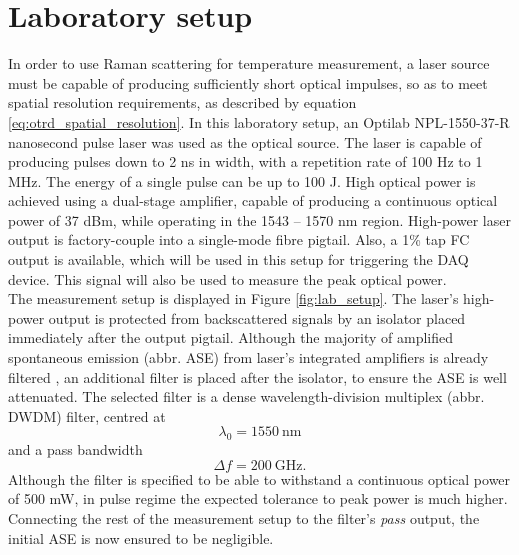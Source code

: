\documentclass{standalone}
\begin{document}
\chapter{Laboratory setup} \label{ch:setup}
\setcounter{page}\thestranica


In order to use Raman scattering for temperature measurement, a laser source must be capable of producing sufficiently short optical impulses, so as to meet spatial resolution requirements, as described by equation \ref{eq:otrd_spatial_resolution}. In this laboratory setup, an Optilab NPL-1550-37-R nanosecond pulse laser was used as the optical source. The laser is capable of producing pulses down to 2 ns in width, with a repetition rate of 100 Hz to 1 MHz. The energy of a single pulse can be up to 100 \textmu J. High optical power is achieved using a dual-stage amplifier, capable of producing a continuous optical power of 37 dBm, while operating in the 1543 -- 1570 nm region. High-power laser output is factory-couple into a single-mode fibre pigtail. Also, a 1\% tap FC output is available, which will be used in this setup for triggering the DAQ device. This signal will also be used to measure the peak optical power. \\

The measurement setup is displayed in Figure \ref{fig:lab_setup}.
The laser's high-power output is protected from backscattered signals by an isolator placed immediately after the output pigtail. Although the majority of amplified spontaneous emission (abbr. ASE) from laser's integrated amplifiers is already filtered \cite{datasheet:laser}, an additional filter is placed after the isolator, to ensure the ASE is well attenuated. The selected filter is a dense wavelength-division multiplex (abbr. DWDM) filter, centred at \cite{datasheet:dwdm_filter}
\begin{equation}
\label{eq:dwdm_filter_centre}
\lambda_0 = \SI{1550}{\nano \meter}
\end{equation} and a pass bandwidth 
\begin{equation}
\label{eq:dwdm_filter_bw}
\varDelta f = \SI{200}{\giga \hertz} \textrm{.}
\end{equation}
Although the filter is specified to be able to withstand a continuous optical power of 500 mW, in pulse regime the expected tolerance to peak power is much higher. Connecting the rest of the measurement setup to the filter's \textit{pass} output, the initial ASE is now ensured to be negligible. \\
\end{document}
